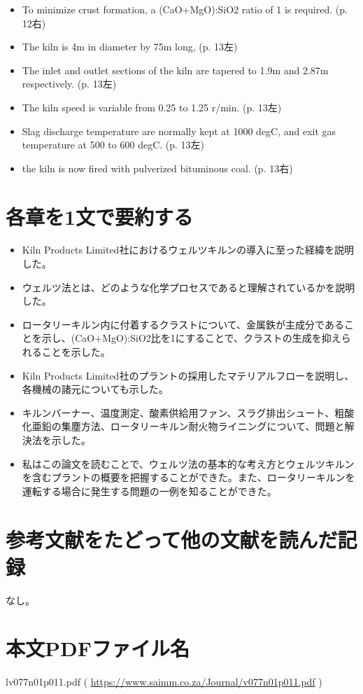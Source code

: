 \documentclass[a4j]{jsarticle}
\begin{document}
\begin{itemize}
\item
  To minimize crust formation, a (CaO+MgO):SiO2 ratio of 1 is required. (p. 12右)
\item
  The kiln is 4m in diameter by 75m long, (p. 13左)
\item
  The inlet and outlet sections of the kiln are tapered to 1.9m and 2.87m respectively. (p. 13左)
\item
  The kiln speed is variable from 0.25 to 1.25 r/min. (p. 13左)
\item
  Slag discharge temperature are normally kept at 1000 degC, and exit gas temperature at 500 to 600 degC. (p. 13左)
\item
  the kiln is now fired with pulverized bituminous coal. (p. 13右)
\end{itemize}


\section{各章を1文で要約する}
\begin{itemize}
\item
  Kiln Products Limited社におけるウェルツキルンの導入に至った経緯を説明した。
\item
  ウェルツ法とは、どのような化学プロセスであると理解されているかを説明した。
\item
  ロータリーキルン内に付着するクラストについて、金属鉄が主成分であることを示し、(CaO+MgO):SiO2比を1にすることで、クラストの生成を抑えられることを示した。
\item
  Kiln Products Limited社のプラントの採用したマテリアルフローを説明し、各機械の諸元についても示した。
\item
  キルンバーナー、温度測定、酸素供給用ファン、スラグ排出シュート、粗酸化亜鉛の集塵方法、ロータリーキルン耐火物ライニングについて、問題と解決法を示した。
\item
  私はこの論文を読むことで、ウェルツ法の基本的な考え方とウェルツキルンを含むプラントの概要を把握することができた。また、ロータリーキルンを運転する場合に発生する問題の一例を知ることができた。
\end{itemize}


\section{参考文献をたどって他の文献を読んだ記録}
なし。

\section{本文PDFファイル名}
lv077n01p011.pdf
(
\url{https://www.saimm.co.za/Journal/v077n01p011.pdf}
)


\end{document}
